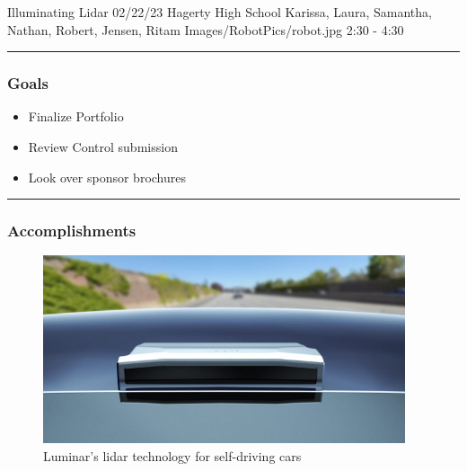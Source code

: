 \insertmeeting 
	{Illuminating Lidar} 
	{02/22/23} 
	{Hagerty High School}
	{Karissa, Laura,  Samantha, Nathan, Robert, Jensen, Ritam}
	{Images/RobotPics/robot.jpg}
	{2:30 - 4:30}
	
\noindent\hfil\rule{\textwidth}{.4pt}\hfil
\subsubsection*{Goals}
\begin{itemize}
    \item Finalize Portfolio
    \item Review Control submission
    \item Look over sponsor brochures

\end{itemize} 

\noindent\hfil\rule{\textwidth}{.4pt}\hfil

\subsubsection*{Accomplishments}

 
\begin{figure}[htp]
\centering
\includegraphics[width=0.95\textwidth, angle=0]{Meetings/February/02-07-23/luminar-iris-roof-mounted-lidar_100767931_m.jpg}
\caption{Luminar's lidar technology for self-driving cars}
\label{fig:pic1}
\end{figure}

